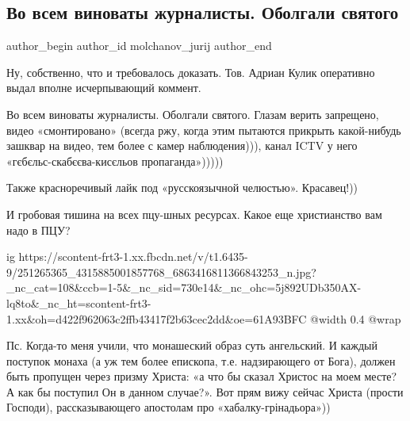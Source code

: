  
 
 
 
 
 
\subsection{Во всем виноваты журналисты. Оболгали святого}
\label{sec:31_10_2021.fb.molchanov_jurij.1.obolgali_svjatogo_adrian_kulik}
 
\ifcmt
 author_begin
   author_id molchanov_jurij
 author_end
\fi

Ну, собственно, что и требовалось доказать. Тов. Адриан Кулик оперативно выдал
вполне исчерпывающий коммент. 

Во всем виноваты журналисты. Оболгали святого. Глазам верить запрещено, видео
«смонтировано» (всегда ржу, когда этим пытаются прикрыть какой-нибудь зашквар
на видео, тем более с камер наблюдения))), канал ICTV у него
«гєбєльс-скабєєва-кисєльов пропаганда»)))))

Также красноречивый лайк под «русскоязычной челюстью». Красавец!))

И гробовая тишина на всех пцу-шных ресурсах. Какое еще христианство вам надо в
ПЦУ?

\ifcmt
  ig https://scontent-frt3-1.xx.fbcdn.net/v/t1.6435-9/251265365_4315885001857768_6863416811366843253_n.jpg?_nc_cat=108&ccb=1-5&_nc_sid=730e14&_nc_ohc=5j892UDb350AX-lq8to&_nc_ht=scontent-frt3-1.xx&oh=d422f962063c2ffb43417f2b63cec2dd&oe=61A93BFC
  @width 0.4
  @wrap 
\fi

Пс. Когда-то меня учили, что монашеский образ суть ангельский. И каждый
поступок монаха (а уж тем более епископа, т.е. надзирающего от Бога), должен
быть пропущен через призму Христа: «а что бы сказал Христос на моем месте? А
как бы поступил Он в данном случае?». Вот прям вижу сейчас Христа (прости
Господи), рассказывающего апостолам про «хабалку-грінадьора»))

